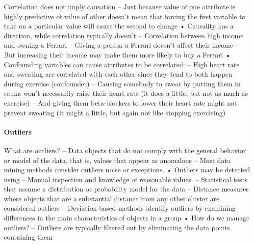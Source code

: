 Correlation does not imply causation
– Just because value of one attribute is highly predictive of value of other doesn’t mean that forcing the
first variable to take on a particular value will cause the second to change
• Causality has a direction, while correlation typically doesn’t
– Correlation between high income and owning a Ferrari
– Giving a person a Ferrari doesn’t affect their income
– But increasing their income may make them more likely to buy a Ferrari
• Confounding variables can cause attributes to be correlated:
– High heart rate and sweating are correlated with each other since they tend to both happen during
exercise (confounder)
– Causing somebody to sweat by putting them in sauna won’t necessarily raise their heart rate (it does
a little, but not as much as exercise)
– And giving them beta-blockers to lower their heart rate might not prevent sweating (it might a little,
but again not like stopping exercising)

\paragraph*{Outliers}
What are outliers?
– Data objects that do not comply with the general behavior or model of the data, that is, values that
appear as anomalous
– Most data mining methods consider outliers noise or exceptions.
• Outliers may be detected using
– Manual inspection and knowledge of reasonable values.
– Statistical tests that assume a distribution or probability model for the data
– Distance measures where objects that are a substantial distance from any other cluster are considered
outliers
– Deviation-based methods identify outliers by examining differences in the main characteristics of
objects in a group
• How do we manage outliers?
– Outliers are typically filtered out by eliminating the data points containing them

